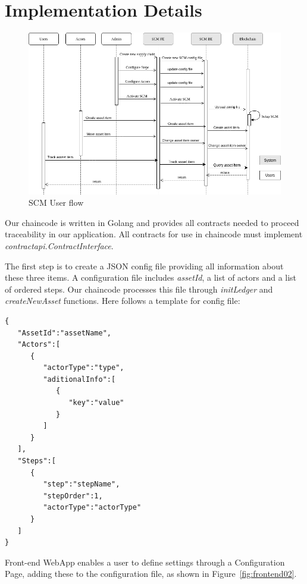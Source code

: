 \section{Implementation Details} \label{sec:Implementation}

\begin{figure}[ht]
\begin{center}
  \includegraphics[scale=0.44]{images/SequenceDiagram.png}
\caption{SCM User flow}
\label{fig:sequenceDiagram}
\end{center}
\end{figure}

Our chaincode is written in Golang and provides all contracts needed to proceed traceability in our application. All contracts for use in chaincode must implement  \textit{contractapi.ContractInterface}. 

The first step is to create a JSON config file providing all information about these three items. A configuration file includes \textit{assetId}, a list of actors and a list of ordered steps. Our chaincode processes this file through  \textit{initLedger} and \textit{createNewAsset} functions. Here follows a template for config file:  

\begin{lstlisting}
{
   "AssetId":"assetName",
   "Actors":[
      {
         "actorType":"type",
         "aditionalInfo":[
            {
               "key":"value"
            }
         ]
      }
   ],
   "Steps":[
      {
         "step":"stepName",
         "stepOrder":1,
         "actorType":"actorType"
      }
   ]
}
\end{lstlisting}

Front-end WebApp enables a user to define settings through a Configuration Page, adding these to the configuration file, as shown in Figure~\ref{fig:frontend02}.

